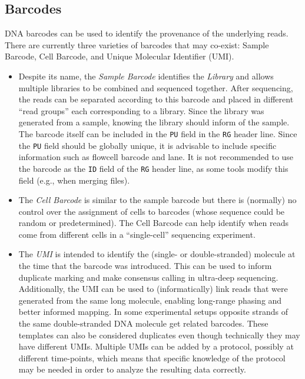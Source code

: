 \documentclass[10pt]{article}
\begin{document}
\subsection{Barcodes}
DNA barcodes can be used to identify the provenance of the underlying reads.
There are currently three varieties of barcodes that may co-exist: Sample Barcode, Cell Barcode, and Unique Molecular Identifier (UMI).
\begin{itemize}
\item
Despite its name, the \emph{Sample Barcode} identifies the \emph{Library} and allows multiple libraries to be combined and sequenced together.
After sequencing, the reads can be separated according to this barcode and placed in different ``read groups'' each corresponding to a library.
Since the library was generated from a sample, knowing the library should inform of the sample.
The barcode itself can be included in the {\tt PU} field in the {\tt RG} header line.
Since the {\tt PU} field should be globally unique, it is advisable to include specific information such as flowcell barcode and lane.
It is not recommended to use the barcode as the {\tt ID} field of the {\tt RG} header line, as some tools modify this field (e.g., when merging files).
\item
The \emph{Cell Barcode} is similar to the sample barcode but there is (normally) no control over the assignment of cells to barcodes (whose sequence could be random or predetermined).
The Cell Barcode can help identify when reads come from different cells in a ``single-cell'' sequencing experiment.

\item
The \emph{UMI} is intended to identify the (single- or double-stranded) molecule at the time that the barcode was introduced.
This can be used to inform duplicate marking and make consensus calling in ultra-deep sequencing.
Additionally, the UMI can be used to (informatically) link reads that were generated from the same long molecule, enabling long-range phasing and better informed mapping.
In some experimental setups opposite strands of the same double-stranded DNA molecule get related barcodes.
These templates can also be considered duplicates even though technically they may have different UMIs.
Multiple UMIs can be added by a protocol, possibly at different time-points, which means that specific knowledge of the protocol may be needed in order to analyze the resulting data correctly.
\end{itemize}
\end{document}
